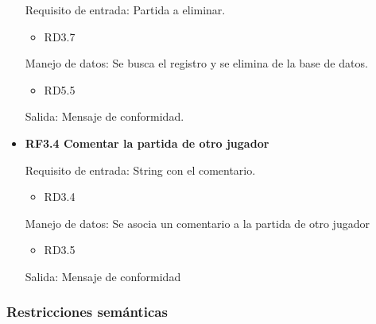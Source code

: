 \begin{itemize}
	Requisito de entrada: Partida a eliminar.
	\begin{itemize}
		\item RD3.7
	\end{itemize}

	Manejo de datos: Se busca el registro y se elimina de la base de datos. \\
	\begin{itemize}
		\item RD5.5
	\end{itemize}

	Salida: Mensaje de conformidad. \\

	\item \textbf{RF3.4 Comentar la partida de otro jugador}

	Requisito de entrada: String con el comentario.
	\begin{itemize}
		\item RD3.4
	\end{itemize}

	Manejo de datos: Se asocia un comentario a la partida de otro jugador
	\begin{itemize}
		\item RD3.5
	\end{itemize}

	Salida: Mensaje de conformidad \\

\end{itemize}

	\subsubsection{Restricciones semánticas}

